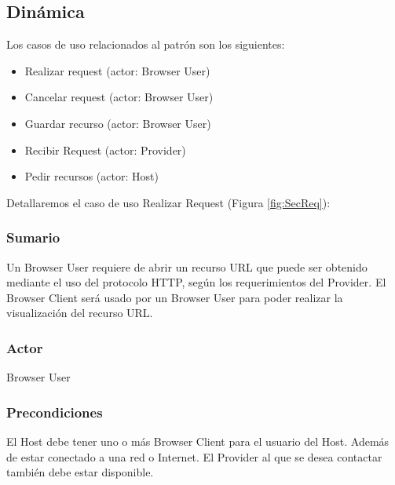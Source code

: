 \subsection{Dinámica}
Los casos de uso relacionados al patrón son los siguientes:
\begin{itemize}
	\item Realizar request (actor: Browser User)
	\item Cancelar request (actor: Browser User)
	\item Guardar recurso (actor: Browser User)
	\item Recibir Request (actor: Provider)
	\item Pedir recursos (actor: Host)
\end{itemize}
Detallaremos el caso de uso Realizar Request (Figura \ref{fig:SecReq}):
\subsubsection{Sumario} Un Browser User requiere de abrir un recurso URL que puede ser obtenido mediante el uso del protocolo HTTP, según los requerimientos del Provider. El Browser Client será usado por un Browser User para poder realizar la visualización del recurso URL.
\subsubsection{Actor} Browser User
\subsubsection{Precondiciones} El Host debe tener uno o más Browser Client para el usuario del Host. Además de estar conectado a una red o Internet. El Provider al que se desea contactar también debe estar disponible.
